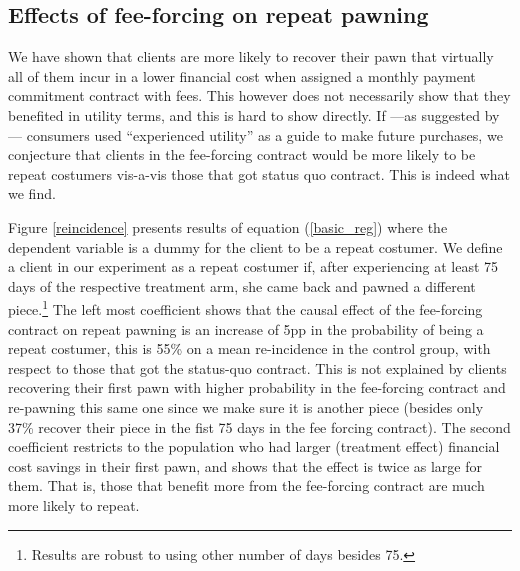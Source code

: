 \documentclass[11pt]{article}
\begin{document}
\subsection{Effects of fee-forcing on repeat pawning}

We have shown that clients are more likely to recover their pawn that virtually all of them incur in a lower financial cost  when assigned a monthly payment commitment contract with fees. This however does not necessarily show that they benefited in utility terms, and this is hard to show directly. If ---as suggested by \cite{Laibson2018}--- consumers used ``experienced utility'' as a guide to make future purchases, we conjecture that clients in the fee-forcing contract would be more likely to be repeat costumers vis-a-vis those that got status quo contract. This is indeed what we find. 

Figure \ref{reincidence} presents results of equation (\ref{basic_reg}) where the dependent variable is a dummy for the client to be a repeat costumer. We define a client in our experiment as a repeat costumer if, after experiencing at least 75 days of the respective treatment arm, she came back and pawned a different piece.\footnote{Results are robust to using other number of days besides 75.}  The left most coefficient shows that the causal effect of the fee-forcing contract on repeat pawning is an increase of 5pp in the probability of being a repeat costumer, this is 55\% on a mean re-incidence in the control group, with respect to those that got the status-quo contract. This is not explained by clients recovering their first pawn with higher probability in the fee-forcing contract and re-pawning this same one since we make sure it is another piece (besides only 37\% recover their piece in the fist 75 days in the fee forcing contract). The second coefficient restricts to the population who had larger (treatment effect) financial cost savings in their first pawn, and shows that the effect is twice as large for them. That is, those that benefit more from the fee-forcing contract are much more likely to repeat. %
\end{document}
